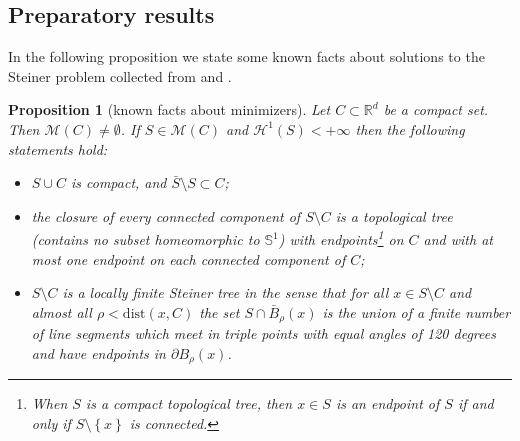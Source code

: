 \documentclass{amsart}
\newcommand{\RR}{\mathbb R}
\renewcommand{\H}{\mathcal H}
\newcommand{\ENCLOSE}[1]{\left\{#1\right\}}
\newcommand{\M}{\mathcal{M}}
\renewcommand{\H}{\mathcal{H}}
\newcommand{\dist}{\mathrm{dist}}
\newtheorem{proposition}[theorem]{Proposition}
\newtheorem{conjecture}[theorem]{Conjecture}
\theoremstyle{definition}
\theoremstyle{remark}
\begin{document}
% 
% 

\subsection{Preparatory results}

In the following proposition we state some known facts about 
solutions to the Steiner problem collected from \cite{PaoSte12}
and \cite{IvaTuz94}.

\begin{proposition}[known facts about minimizers]\label{prop:PaoSte}
  Let $C\subset \RR^d$ be a compact set.
  Then $\M(C)\neq \emptyset$. If $S\in \M(C)$
  and $\H^1(S)<+\infty$
  then the following statements hold:
  \begin{itemize}
    \item[(i)] $S\cup C$ is compact, 
    and $\bar S \setminus S \subset C$;
    \item[(ii)] the closure of every connected component of $S\setminus C$     
    is a topological tree 
    (contains no subset homeomorphic to $\mathbb S^1$)
    with endpoints\footnote{%
    When $S$ is a compact topological tree, then $x\in S$ is an endpoint 
    of $S$ if and only if $S\setminus \ENCLOSE{x}$ is connected.} 
    on $C$ and with at most one endpoint 
    on each connected component of $C$;
    \item[(iii)] $S\setminus C$ is a locally finite Steiner tree in the sense that 
    for all $x\in S\setminus C$ and almost all 
    $\rho < \dist(x,C)$ the set $S\cap \bar B_\rho(x)$ 
    is the union of a finite number of line 
    segments which meet in triple points with equal 
    angles of 120 degrees and have endpoints in 
    $\partial B_\rho(x)$.

  \end{itemize}
\end{proposition}
\end{document}
